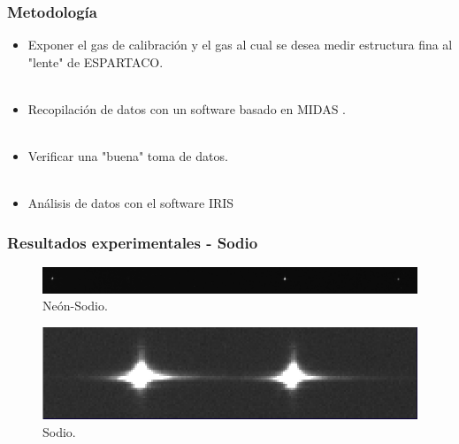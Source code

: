 \documentclass{beamer}
\begin{document}
\begin{frame}[fragile] %
\frametitle{Metodología}
%
\begin{itemize}
	\item Exponer el gas de calibración y el gas al cual se desea medir estructura fina al "lente" de ESPARTACO.
	\
	\\
	
	\
	\\
	
	\item Recopilación de datos con un software basado en MIDAS \cite{midas}.
	\
	\\
	
	\
	\\
	
	\item Verificar una "buena" toma de datos.
	\
	\\
	
	\
	\\
	
	\item Análisis de datos con el software IRIS \cite{iris}
\end{itemize}

\end{frame}

\begin{frame}[fragile]
\frametitle{Resultados experimentales - Sodio}
\begin{figure}[h!]
	\centering
	\includegraphics[width=1.\textwidth,height = 0.2\textheight]{neon-sodio}
	\caption{Neón-Sodio.}
\end{figure}

\begin{figure}[h!]
	\centering
	\includegraphics[width=1.\textwidth,height = 0.3\textheight]{sodio}
	\caption{Sodio.}
\end{figure}
\end{frame}
\end{document}
